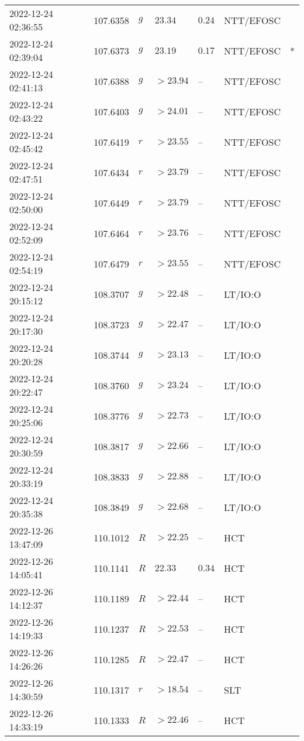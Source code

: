 \documentclass{nature_plusfigure}
\begin{document}
\begin{supplement}
\begin{center}
\begin{longtable}{lllllll}
2022-12-24 02:36:55 & 107.6358 & $g$ & $23.34$ & $0.24$ & NTT/EFOSC &  \\ 
2022-12-24 02:39:04 & 107.6373 & $g$ & $23.19$ & $0.17$ & NTT/EFOSC & * \\ 
2022-12-24 02:41:13 & 107.6388 & $g$ & $>23.94$ & -- & NTT/EFOSC &  \\ 
2022-12-24 02:43:22 & 107.6403 & $g$ & $>24.01$ & -- & NTT/EFOSC &  \\ 
2022-12-24 02:45:42 & 107.6419 & $r$ & $>23.55$ & -- & NTT/EFOSC &  \\ 
2022-12-24 02:47:51 & 107.6434 & $r$ & $>23.79$ & -- & NTT/EFOSC &  \\ 
2022-12-24 02:50:00 & 107.6449 & $r$ & $>23.79$ & -- & NTT/EFOSC &  \\ 
2022-12-24 02:52:09 & 107.6464 & $r$ & $>23.76$ & -- & NTT/EFOSC &  \\ 
2022-12-24 02:54:19 & 107.6479 & $r$ & $>23.55$ & -- & NTT/EFOSC &  \\ 
2022-12-24 20:15:12 & 108.3707 & $g$ & $>22.48$ & -- & LT/IO:O &  \\ 
2022-12-24 20:17:30 & 108.3723 & $g$ & $>22.47$ & -- & LT/IO:O &  \\ 
2022-12-24 20:20:28 & 108.3744 & $g$ & $>23.13$ & -- & LT/IO:O &  \\ 
2022-12-24 20:22:47 & 108.3760 & $g$ & $>23.24$ & -- & LT/IO:O &  \\ 
2022-12-24 20:25:06 & 108.3776 & $g$ & $>22.73$ & -- & LT/IO:O &  \\ 
2022-12-24 20:30:59 & 108.3817 & $g$ & $>22.66$ & -- & LT/IO:O &  \\ 
2022-12-24 20:33:19 & 108.3833 & $g$ & $>22.88$ & -- & LT/IO:O &  \\ 
2022-12-24 20:35:38 & 108.3849 & $g$ & $>22.68$ & -- & LT/IO:O &  \\ 
2022-12-26 13:47:09 & 110.1012 & $R$ & $>22.25$ & -- & HCT &  \\ 
2022-12-26 14:05:41 & 110.1141 & $R$ & $22.33$ & $0.34$ & HCT &  \\ 
2022-12-26 14:12:37 & 110.1189 & $R$ & $>22.44$ & -- & HCT &  \\ 
2022-12-26 14:19:33 & 110.1237 & $R$ & $>22.53$ & -- & HCT &  \\ 
2022-12-26 14:26:26 & 110.1285 & $R$ & $>22.47$ & -- & HCT &  \\ 
2022-12-26 14:30:59 & 110.1317 & $r$ & $>18.54$ & -- & SLT &  \\ 
2022-12-26 14:33:19 & 110.1333 & $R$ & $>22.46$ & -- & HCT &  \\ 

\end{longtable}
\end{center}
\end{supplement}
\end{document}
